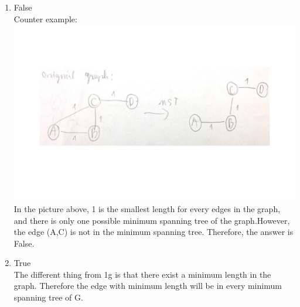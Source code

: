 \documentclass[11pt]{article}
\newenvironment{qparts}{\begin{enumerate}[{(}a{)}]}{\end{enumerate}}
\begin{document}
\begin{qparts}
\item
False\\
Counter example:\\
\includegraphics[scale=0.25]{p1g.png}\\
In the picture above, 1 is the smallest length for every edges in the graph, and there is only one possible minimum spanning tree of the graph.However, the edge (A,C) is not in the minimum spanning tree. Therefore, the answer is False.
\item
True\\
The different thing from 1g is that there exist a minimum length in the graph. Therefore the edge with minimum length will be in every minimum spanning tree of G.\\
\end{qparts}





\newpage
\end{document}
